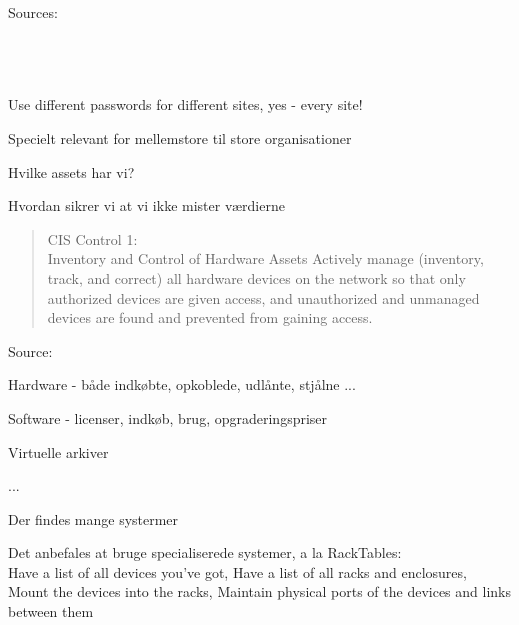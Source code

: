 \documentclass[Screen16to9,17pt]{foils}
\begin{document}
 Sources:\\
{\footnotesize{}\\
\\
\\
}

\vskip 5mm
\centerline{Use different passwords for different sites, yes - every site!}





\begin{list2}
\item Specielt relevant for mellemstore til store organisationer
\item Hvilke assets har vi?
\item Hvordan sikrer vi at vi ikke mister værdierne
\end{list2}



\begin{quote}
CIS Control 1:\\
Inventory and Control of Hardware Assets
Actively manage (inventory, track, and correct) all hardware devices on the network so that only
authorized devices are given access, and unauthorized and unmanaged devices are found and
prevented from gaining access.
\end{quote}
Source: 

\begin{list2}
\item Hardware - både indkøbte, opkoblede, udlånte, stjålne ...
\item Software - licenser, indkøb, brug, opgraderingspriser
\item Virtuelle arkiver
\item ...
\end{list2}



\begin{list2}
\item Der findes mange systermer
\item Det anbefales at bruge specialiserede systemer, a la RackTables:\\
Have a list of all devices you've got,
Have a list of all racks and enclosures,
Mount the devices into the racks,
Maintain physical ports of the devices and links between them
\end{list2}
\end{document}
